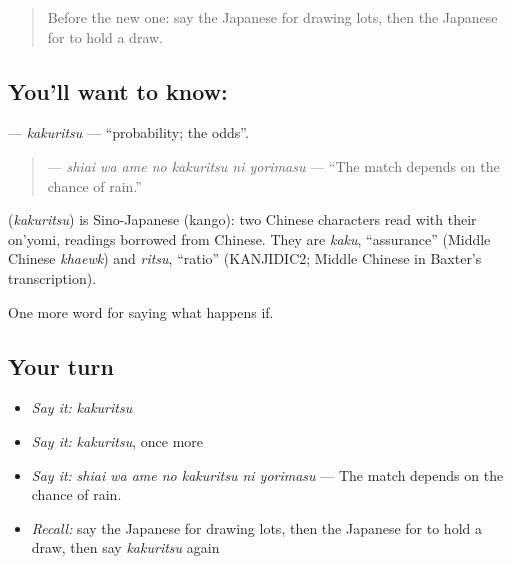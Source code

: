 \label{lesson:JA-C509-kakuritsu}



\begin{quote}
Before the new one: say the Japanese for drawing lots, then the Japanese for to hold a draw.
\end{quote}

\subsection*{You'll want to know: }
\textbf{} — \emph{kakuritsu} — \textquotedblleft{}probability; the odds\textquotedblright{}.

\begin{quote}
\textbf{   } — \emph{shiai wa ame no kakuritsu ni yorimasu} — \textquotedblleft{}The match depends on the chance of rain.\textquotedblright{}
\end{quote}

\begin{cousinweb}
\textbf{} (\emph{kakuritsu}) is Sino-Japanese (kango): two Chinese characters read with their on'yomi, readings borrowed from Chinese. They are \emph{kaku}, \textquotedblleft{}assurance\textquotedblright{} (Middle Chinese \emph{khaewk}) and \emph{ritsu}, \textquotedblleft{}ratio\textquotedblright{} (KANJIDIC2; Middle Chinese in Baxter's transcription).
\end{cousinweb}

\begin{grammarlens}[title={What you've built}]
One more word for saying what happens if.
\end{grammarlens}

\subsection*{Your turn}
\begin{itemize}
\raggedright
  \item \emph{Say it:} \emph{kakuritsu}
  \item \emph{Say it:} \emph{kakuritsu}, once more
  \item \emph{Say it:} \emph{shiai wa ame no kakuritsu ni yorimasu} — The match depends on the chance of rain.
  \item \emph{Recall:} say the Japanese for drawing lots, then the Japanese for to hold a draw, then say \emph{kakuritsu} again
\end{itemize}

